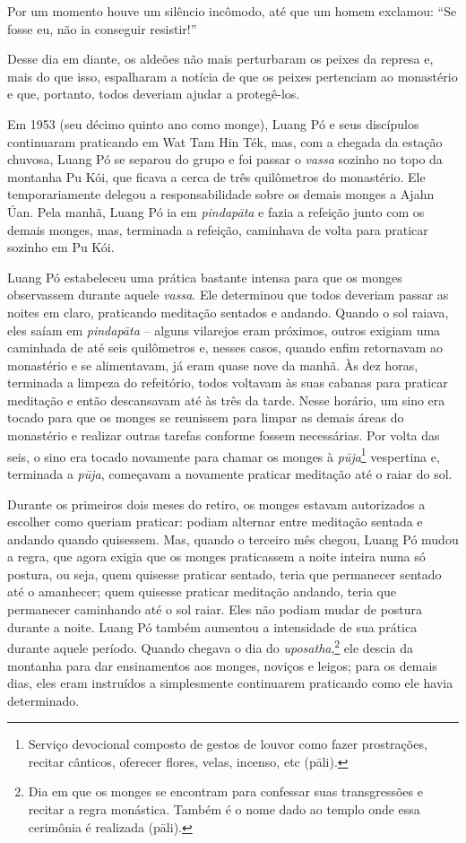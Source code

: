 Por um momento houve um silêncio incômodo, até que um homem exclamou:
``Se fosse eu, não ia conseguir resistir!''

Desse dia em diante, os aldeões não mais perturbaram os peixes da
represa e, mais do que isso, espalharam a notícia de que os peixes
pertenciam ao monastério e que, portanto, todos deveriam ajudar a
protegê-los.

Em 1953 (seu décimo quinto ano como monge), Luang Pó e seus discípulos
continuaram praticando em Wat Tam Hin Ték, mas, com a chegada da estação
chuvosa, Luang Pó se separou do grupo e foi passar o \emph{vassa}
sozinho no topo da montanha Pu Kói, que ficava a cerca de três
quilômetros do monastério. Ele temporariamente delegou a
responsabilidade sobre os demais monges a Ajahn Úan. Pela manhã, Luang
Pó ia em \emph{pindapāta} e fazia a refeição junto com os demais monges,
mas, terminada a refeição, caminhava de volta para praticar sozinho em
Pu Kói.

Luang Pó estabeleceu uma prática bastante intensa para que os monges
observassem durante aquele \emph{vassa}. Ele determinou que todos
deveriam passar as noites em claro, praticando meditação sentados e
andando. Quando o sol raiava, eles saíam em \emph{pindapāta} -- alguns
vilarejos eram próximos, outros exigiam uma caminhada de até seis
quilômetros e, nesses casos, quando enfim retornavam ao monastério e se
alimentavam, já eram quase nove da manhã. Às dez horas, terminada a
limpeza do refeitório, todos voltavam às suas cabanas para praticar
meditação e então descansavam até às três da tarde. Nesse horário, um
sino era tocado para que os monges se reunissem para limpar as demais
áreas do monastério e realizar outras tarefas conforme fossem
necessárias. Por volta das seis, o sino era tocado novamente para chamar
os monges à \emph{pūja}\footnote{Serviço devocional composto de gestos
  de louvor como fazer prostrações, recitar cânticos, oferecer flores,
  velas, incenso, etc (pāli).} vespertina e, terminada a \emph{pūja},
começavam a novamente praticar meditação até o raiar do sol.

Durante os primeiros dois meses do retiro, os monges estavam autorizados
a escolher como queriam praticar: podiam alternar entre meditação
sentada e andando quando quisessem. Mas, quando o terceiro mês chegou,
Luang Pó mudou a regra, que agora exigia que os monges praticassem a
noite inteira numa só postura, ou seja, quem quisesse praticar sentado,
teria que permanecer sentado até o amanhecer; quem quisesse praticar
meditação andando, teria que permanecer caminhando até o sol raiar. Eles
não podiam mudar de postura durante a noite. Luang Pó também aumentou a
intensidade de sua prática durante aquele período. Quando chegava o dia
do \emph{uposatha},\footnote{Dia em que os monges se encontram para
  confessar suas transgressões e recitar a regra monástica. Também é o
  nome dado ao templo onde essa cerimônia é realizada (pāli).}
ele descia da montanha para dar ensinamentos aos monges, noviços e
leigos; para os demais dias, eles eram instruídos a simplesmente
continuarem praticando como ele havia determinado.

